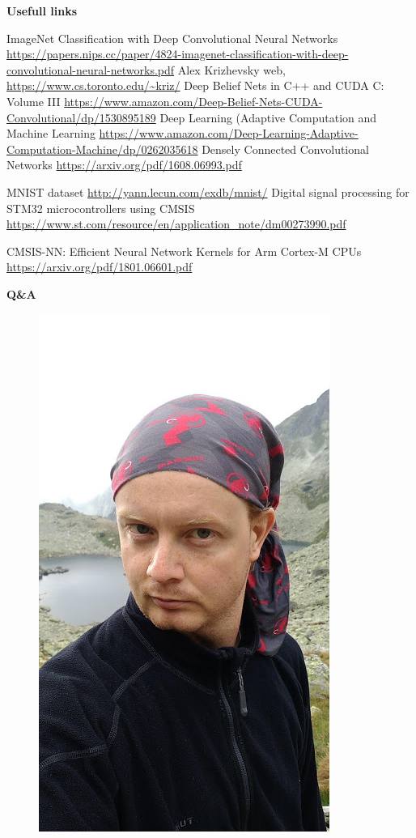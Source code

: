 \documentclass[xcolor=dvipsnames]{beamer}
\begin{document}
\begin{frame}{\bf Usefull links}

{\tiny
  \begin{thebibliography}{9}
    \bibitem {}ImageNet Classification with Deep Convolutional Neural Networks \url{https://papers.nips.cc/paper/4824-imagenet-classification-with-deep-convolutional-neural-networks.pdf}
    \bibitem {}Alex Krizhevsky web, \url{https://www.cs.toronto.edu/~kriz/}
    \bibitem {}Deep Belief Nets in C++ and CUDA C: Volume III \url{https://www.amazon.com/Deep-Belief-Nets-CUDA-Convolutional/dp/1530895189}
    \bibitem {}Deep Learning (Adaptive Computation and Machine Learning \url{https://www.amazon.com/Deep-Learning-Adaptive-Computation-Machine/dp/0262035618}
    \bibitem {}Densely Connected Convolutional Networks \url{https://arxiv.org/pdf/1608.06993.pdf}

    \bibitem {}MNIST dataset \url{http://yann.lecun.com/exdb/mnist/}
    \bibitem {}Digital signal processing for STM32 microcontrollers using CMSIS \url{https://www.st.com/resource/en/application_note/dm00273990.pdf}

    \bibitem {}CMSIS-NN: Efficient Neural Network Kernels for Arm Cortex-M CPUs \url{https://arxiv.org/pdf/1801.06601.pdf}

  \end{thebibliography}
}

\end{frame}


\begin{frame}{\bf Q\&A}

\begin{figure}
  \includegraphics[scale=0.25]{../../pictures/me.jpg}
\end{figure}


\end{frame}
\end{document}
